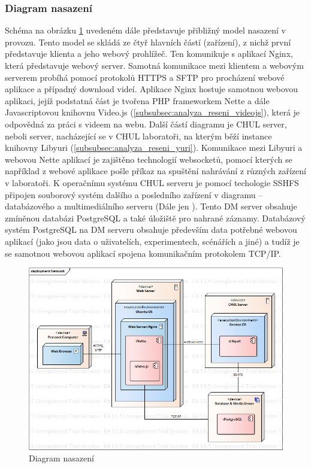 \documentclass[thesis=M,czech]{FITthesis}[2012/06/26]
\begin{document}
\subsubsection{Diagram nasazení} \label{subsubsec:navrh_architektura_nasazeni}
Schéma na obrázku \ref{img:navrh_architektura_nasazeni} uvedeném dále představuje přibližný model nasazení v provozu. Tento model se skládá ze čtyř hlavních částí (zařízení), z nichž první představuje klienta a jeho webový prohlížeč. Ten komunikuje
s aplikací Nginx, která představuje webový server. Samotná komunikace mezi klientem a webovým serverem probíhá pomocí protokolů HTTPS a SFTP pro procházení webové aplikace a případný download videí. Aplikace Nginx hostuje samotnou webovou aplikaci, jejíž podstatná část je tvořena PHP frameworkem Nette a dále Javascriptovou knihovnu Video.js (\ref{subsubsec:analyza_reseni_videojs}), která je odpovědná za práci s videem na webu. Další částí diagramu je CHUL server, neboli server, nacházející se v CHUL laboratoři, na kterým běží instance knihovny Libyuri (\ref{subsubsec:analyza_reseni_yuri}).  Komunikace mezi Libyuri a webovou Nette aplikací je zajištěno technologií websocketů, pomocí kterých se například z webové aplikace pošle příkaz na spuštění nahrávání z různých zařízení v laboratoři. K operačnímu systému CHUL serveru je pomocí techologie SSHFS připojen souborový systém dalšího a posledního zařízení v diagramu -- databázového a multimediálního serveru (Dále jen ). Tento DM server obsahuje zmíněnou databázi PostgreSQL a také úložiště pro nahrané záznamy. Databázový systém PostgreSQL na DM serveru obsahuje především data potřebné webovou aplikací (jako jsou data o uživatelích, experimentech, scénářích a jiné) a tudíž je se samotnou webovou aplikací spojena komunikačním protokolem TCP/IP. 
\\
\begin{figure}[h]\centering
	\includegraphics[width=1\textwidth]{images/nasazeni.png}
	\caption{Diagram nasazení}\label{img:navrh_architektura_nasazeni}
\end{figure}
\end{document}
